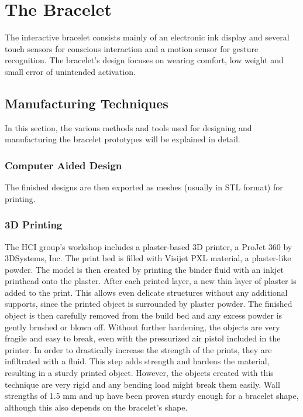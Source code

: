 \chapter{The Bracelet}

The interactive bracelet consists mainly of an electronic ink display and several touch sensors for conscious interaction and a motion sensor for gesture recognition. The bracelet's design focuses on wearing comfort, low weight and small error of unintended activation.

\section{Manufacturing Techniques}

In this section, the various methods and tools used for designing and manufacturing the bracelet prototypes will be explained in detail.

\subsection{Computer Aided Design}
The finished designs are then exported as meshes (usually in \ac{STL} format) for printing.

\subsection{3D Printing}
The \ac{HCI} group's workshop includes a plaster-based 3D printer, a ProJet 360 by 3DSystems, Inc. The print bed is filled with Visijet PXL material, a plaster-like powder. The model is then created by printing the binder fluid with an inkjet printhead onto the plaster. After each printed layer, a new thin layer of plaster is added to the print. This allows even delicate structures without any additional supports, since the printed object is surrounded by plaster powder. The finished object is then carefully removed from the build bed and any excess powder is gently brushed or blown off. Without further hardening, the objects are very fragile and easy to break, even with the pressurized air pistol included in the printer. In order to drastically increase the strength of the prints, they are infiltrated with a fluid. This step adds strength and hardens the material, resulting in a sturdy printed object. However, the objects created with this technique are very rigid and any bending load might break them easily. Wall strengths of 1.5 mm and up have been proven sturdy enough for a bracelet shape, although this also depends on the bracelet's shape.

